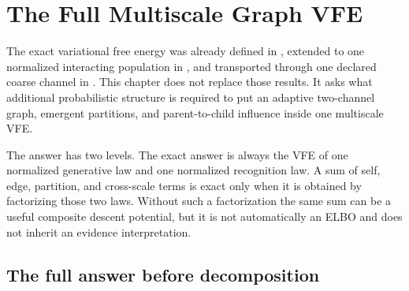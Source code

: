 \chapter{The Full Multiscale Graph VFE}
\label{ch:full-graph-meta-agent-vfe}

The exact variational free energy was already defined in ,
extended to one normalized interacting population in
, and transported through one declared coarse
channel in . This chapter does not replace those
results. It asks what additional probabilistic structure is required to put
an adaptive two-channel graph, emergent partitions, and parent-to-child
influence inside one multiscale VFE.

The answer has two levels. The exact answer is always the VFE of one
normalized generative law and one normalized recognition law. A sum of self,
edge, partition, and cross-scale terms is exact only when it is obtained by
factorizing those two laws. Without such a factorization the same sum can be a
useful composite descent potential, but it is not automatically an ELBO and
does not inherit an evidence interpretation. 

\section{The full answer before decomposition}
\label{sec:full-graph-vfe-global}

